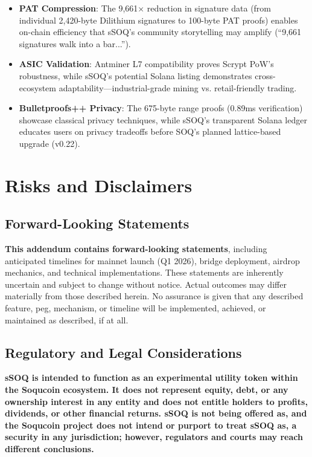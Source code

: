 \documentclass[10pt]{article}
\begin{document}
\begin{itemize}
    \item \textbf{PAT Compression}: The 9,661× reduction in signature data (from individual 2,420-byte Dilithium signatures to 100-byte PAT proofs) enables on-chain efficiency that sSOQ's community storytelling may amplify (``9,661 signatures walk into a bar...'').
    \item \textbf{ASIC Validation}: Antminer L7 compatibility proves Scrypt PoW's robustness, while sSOQ's potential Solana listing demonstrates cross-ecosystem adaptability—industrial-grade mining vs. retail-friendly trading.
    \item \textbf{Bulletproofs++ Privacy}: The 675-byte range proofs (0.89ms verification) showcase classical privacy techniques, while sSOQ's transparent Solana ledger educates users on privacy tradeoffs before SOQ's planned lattice-based upgrade (v0.22).
\end{itemize}

\section{Risks and Disclaimers}

\subsection{Forward-Looking Statements}

\textbf{This addendum contains forward-looking statements}, including anticipated timelines for mainnet launch (Q1 2026), bridge deployment, airdrop mechanics, and technical implementations. These statements are inherently uncertain and subject to change without notice. Actual outcomes may differ materially from those described herein. No assurance is given that any described feature, peg, mechanism, or timeline will be implemented, achieved, or maintained as described, if at all.

\subsection{Regulatory and Legal Considerations}

\textbf{sSOQ is intended to function as an experimental utility token within the Soqucoin ecosystem. It does not represent equity, debt, or any ownership interest in any entity and does not entitle holders to profits, dividends, or other financial returns. sSOQ is not being offered as, and the Soqucoin project does not intend or purport to treat sSOQ as, a security in any jurisdiction; however, regulators and courts may reach different conclusions.}
\end{document}
